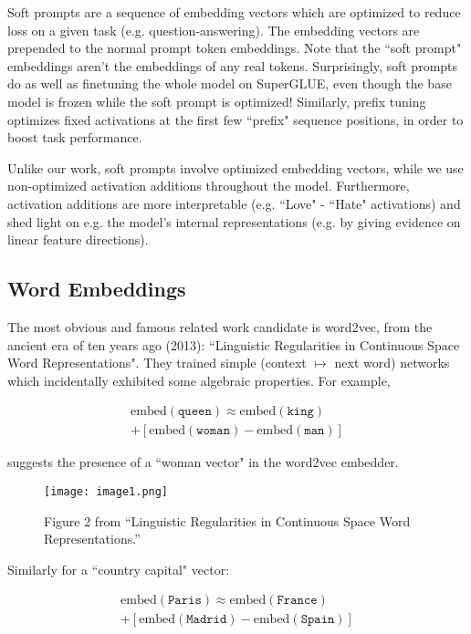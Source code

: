 \documentclass[10pt]{article}
\newcommand{\embed}{\mathrm{embed}}
\begin{document}
Soft prompts \citep{lester-etal-2021-power} are a sequence of embedding vectors which are optimized to reduce loss on a given task (e.g. question-answering). The embedding vectors are prepended to the normal prompt token embeddings. Note that the ``soft prompt" embeddings aren't the embeddings of any real tokens. Surprisingly, soft prompts do as well as finetuning the whole model on SuperGLUE, even though the base model is frozen while the soft prompt is optimized! Similarly, prefix tuning \citep{li-liang-2021-prefix} optimizes fixed activations at the first few ``prefix" sequence positions, in order to boost task performance.

Unlike our work, soft prompts involve optimized embedding vectors, while we use non-optimized activation additions throughout the model. Furthermore, activation additions are more interpretable (e.g. ``Love" - ``Hate" activations) and shed light on e.g. the model's internal representations (e.g. by giving evidence on linear feature directions). 

\subsection{Word Embeddings}
The most obvious and famous related work candidate is word2vec, from the ancient era of ten years ago (2013): \citet{mikolov2013linguistic} ``Linguistic Regularities in Continuous Space Word Representations". They trained simple (context $\mapsto$ next word) networks which incidentally exhibited some algebraic properties. For example, 

\begin{multline}
	\embed(\texttt{queen}) \approx \embed(\texttt{king}) \\
	+ [\embed(\texttt{woman}) - \embed(\texttt{man})]
\end{multline}

suggests the presence of a ``woman vector" in the word2vec embedder.

\begin{figure}[h]
\centering
\texttt{[image: image1.png]}
\caption{Figure 2 from ``Linguistic Regularities in Continuous Space Word Representations.''}
\label{fig:image1}
\end{figure}

Similarly for a ``country capital" vector:

\begin{multline}
	\embed(\texttt{Paris}) \approx \embed(\texttt{France}) \\
	+ [\embed(\texttt{Madrid}) - \embed(\texttt{Spain})]
\end{multline}
\end{document}
